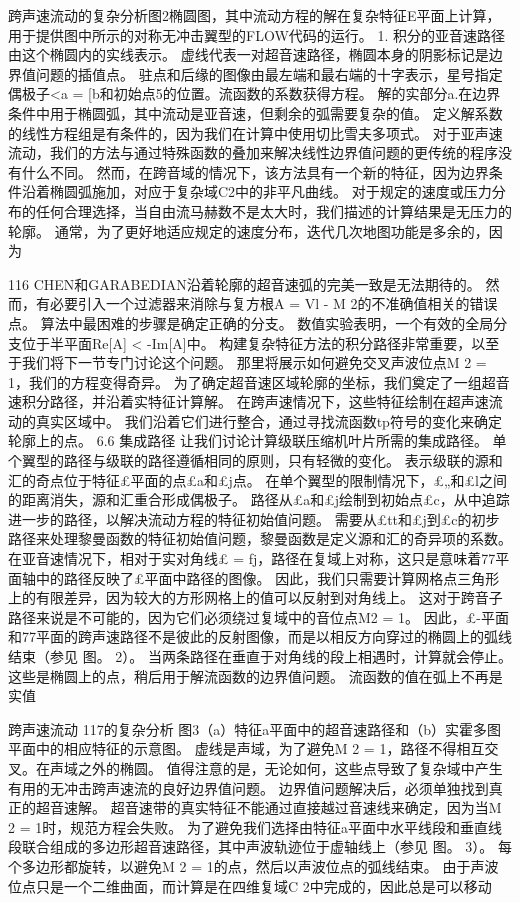 \documentclass[UTF8,11pt,a4paper,openany,fontset=fandol]{ctexbook}
\begin{document}
跨声速流动的复杂分析图2椭圆图，其中流动方程的解在复杂特征E平面上计算，用于提供图中所示的对称无冲击翼型的FLOW代码的运行。 1. 积分的亚音速路径由这个椭圆内的实线表示。 虚线代表一对超音速路径，椭圆本身的阴影标记是边界值问题的插值点。 驻点和后缘的图像由最左端和最右端的十字表示，星号指定偶极子<a = [b和初始点5的位置。流函数的系数获得方程。 解的实部分a.在边界条件中用于椭圆弧，其中流动是亚音速，但剩余的弧需要复杂的值。 定义解系数的线性方程组是有条件的，因为我们在计算中使用切比雪夫多项式。 对于亚声速流动，我们的方法与通过特殊函数的叠加来解决线性边界值问题的更传统的程序没有什么不同。 然而，在跨音域的情况下，该方法具有一个新的特征，因为边界条件沿着椭圆弧施加，对应于复杂域C2中的非平凡曲线。 对于规定的速度或压力分布的任何合理选择，当自由流马赫数不是太大时，我们描述的计算结果是无压力的轮廓。 通常，为了更好地适应规定的速度分布，迭代几次地图功能是多余的，因为

116 CHEN和GARABEDIAN沿着轮廓的超音速弧的完美一致是无法期待的。 然而，有必要引入一个过滤器来消除与复方根A = Vl - M 2的不准确值相关的错误点。 算法中最困难的步骤是确定正确的分支。 数值实验表明，一个有效的全局分支位于半平面Re[A] < -Im[A]中。 构建复杂特征方法的积分路径非常重要，以至于我们将下一节专门讨论这个问题。 那里将展示如何避免交叉声波位点M 2 = 1，我们的方程变得奇异。 为了确定超音速区域轮廓的坐标，我们奠定了一组超音速积分路径，并沿着实特征计算解。 在跨声速情况下，这些特征绘制在超声速流动的真实区域中。 我们沿着它们进行整合，通过寻找流函数tp符号的变化来确定轮廓上的点。 6.6 集成路径 让我们讨论计算级联压缩机叶片所需的集成路径。 单个翼型的路径与级联的路径遵循相同的原则，只有轻微的变化。 表示级联的源和汇的奇点位于特征£平面的点£a和£j点。 在单个翼型的限制情况下，£„和£l之间的距离消失，源和汇重合形成偶极子。 路径从£a和£j绘制到初始点£c，从中追踪进一步的路径，以解决流动方程的特征初始值问题。 需要从£tt和£j到£c的初步路径来处理黎曼函数的特征初始值问题，黎曼函数是定义源和汇的奇异项的系数。 在亚音速情况下，相对于实对角线£ = fj，路径在复域上对称，这只是意味着77平面轴中的路径反映了£平面中路径的图像。 因此，我们只需要计算网格点三角形上的有限差异，因为较大的方形网格上的值可以反射到对角线上。 这对于跨音子路径来说是不可能的，因为它们必须绕过复域中的音位点M2 = 1。 因此，£-平面和77平面的跨声速路径不是彼此的反射图像，而是以相反方向穿过的椭圆上的弧线结束（参见 图。 2）。 当两条路径在垂直于对角线的段上相遇时，计算就会停止。 这些是椭圆上的点，稍后用于解流函数的边界值问题。 流函数的值在弧上不再是实值

跨声速流动 117的复杂分析 图3（a）特征a平面中的超音速路径和（b）实霍多图平面中的相应特征的示意图。 虚线是声域，为了避免M 2 = 1，路径不得相互交叉。在声域之外的椭圆。 值得注意的是，无论如何，这些点导致了复杂域中产生有用的无冲击跨声速流的良好边界值问题。 边界值问题解决后，必须单独找到真正的超音速解。 超音速带的真实特征不能通过直接越过音速线来确定，因为当M 2 = 1时，规范方程会失败。 为了避免我们选择由特征a平面中水平线段和垂直线段联合组成的多边形超音速路径，其中声波轨迹位于虚轴线上（参见 图。 3）。 每个多边形都旋转，以避免M 2 = 1的点，然后以声波位点的弧线结束。 由于声波位点只是一个二维曲面，而计算是在四维复域C 2中完成的，因此总是可以移动
\end{document}
